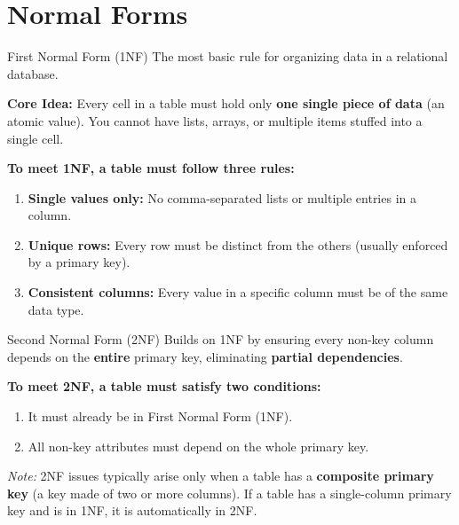 \documentclass[aspectratio=169]{beamer}
\begin{document}
\section{Normal Forms}

\begin{frame}{First Normal Form (1NF)}
    The most basic rule for organizing data in a relational database.

    \vspace{0.3cm}
    \textbf{Core Idea:} Every cell in a table must hold only \textbf{one single piece of data} (an atomic value). You cannot have lists, arrays, or multiple items stuffed into a single cell.

    \vspace{0.5cm}
    \textbf{To meet 1NF, a table must follow three rules:}
    \begin{enumerate}
        \item \textbf{Single values only:} No comma-separated lists or multiple entries in a column.
        \vspace{0.2cm}
        \item \textbf{Unique rows:} Every row must be distinct from the others (usually enforced by a primary key).
        \vspace{0.2cm}
        \item \textbf{Consistent columns:} Every value in a specific column must be of the same data type.
    \end{enumerate}
\end{frame}

\begin{frame}{Second Normal Form (2NF)}
    Builds on 1NF by ensuring every non-key column depends on the \textbf{entire} primary key, eliminating \textbf{partial dependencies}.

    \vspace{0.3cm}
    \textbf{To meet 2NF, a table must satisfy two conditions:}
    \begin{enumerate}
        \item It must already be in First Normal Form (1NF).
        \vspace{0.2cm}
        \item All non-key attributes must depend on the whole primary key.
    \end{enumerate}

    \vspace{0.4cm}
    \textit{Note:} 2NF issues typically arise only when a table has a \textbf{composite primary key} (a key made of two or more columns). If a table has a single-column primary key and is in 1NF, it is automatically in 2NF.
\end{frame}
\end{document}
